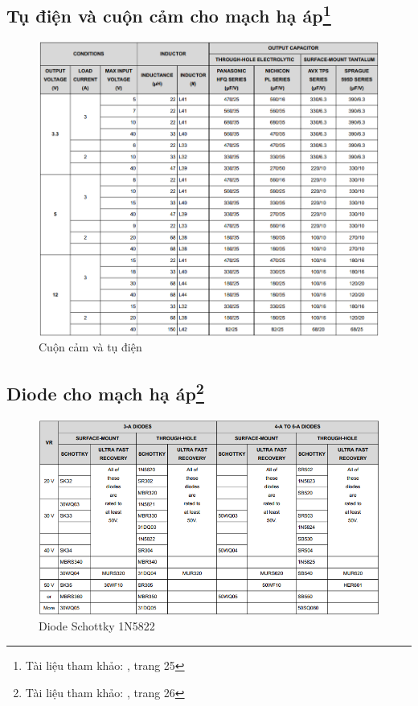         \subsection[Tụ điện và cuộn cảm cho mạch hạ áp]{Tụ điện và cuộn cảm cho mạch hạ áp\footnote{Tài liệu tham khảo: \cite{lm2596}, trang 25}}
            \begin{figure}[H]
                \centering
                \includegraphics[width=1\textwidth]{pictures/appendix/app_p3_ChooseComponent.png}
                \caption{Cuộn cảm và tụ điện}
                \label{fig:InductorAndCapacitor}
            \end{figure}
        \subsection[Diode cho mạch hạ áp]{Diode cho mạch hạ áp\footnote{Tài liệu tham khảo: \cite{lm2596}, trang 26}}
            \begin{figure}[H]
                \centering
                \includegraphics[width=1\textwidth]{pictures/appendix/app_p4_DiodeChoose.png}
                \caption{Diode Schottky 1N5822}
                \label{fig:Diode}
            \end{figure}

